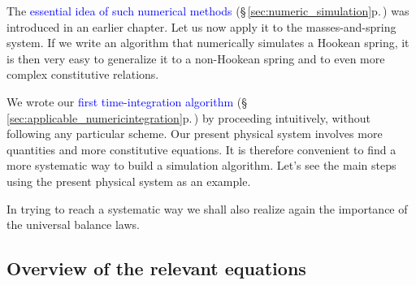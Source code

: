 \documentclass[a4paper,12pt,%
onecolumn,oneside,%
british%
]{memoir}
\renewcommand*{\|}[1][]{\nonscript\:#1\vert\nonscript\:\mathopen{}}
\newcommand*{\sect}{\S}%
\renewcommand*{\autoref}[3][\sect\,\ref]{\textcolor{blue}{#3} {\color{blue}\scriptsize(\faIcon[regular]{eye}\;#1{#2}\;p.\,\pageref{#2})}}
\newcommand*{\masse}{mass-energy}
\begin{document}
The \autoref{sec:numeric_simulation}{essential idea of such numerical methods} was introduced in an earlier chapter. Let us now apply it to the masses-and-spring system. If we write an algorithm that numerically simulates a Hookean spring, it is then very easy to generalize it to a non-Hookean spring and to even more complex constitutive relations.


We wrote our \autoref{sec:applicable_numericintegration}{first time-integration algorithm} by proceeding intuitively, without following any particular scheme. Our present physical system involves more quantities and more constitutive equations. It is therefore convenient to find a more systematic way to build a simulation algorithm. Let's see the main steps using the present physical system as an example.

In trying to reach a systematic way we shall also realize again the importance of the universal balance laws.

\subsection{Overview of the relevant equations}
\label{sec:summary_equations_strategy_script}
\end{document}

